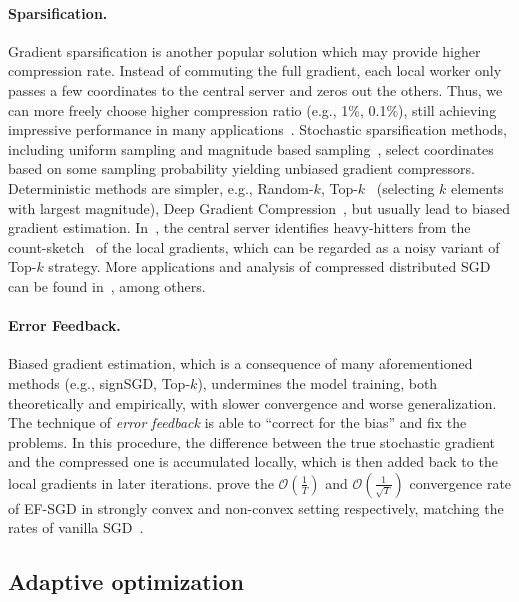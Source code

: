 \documentclass[11pt]{article}
\begin{document}
\paragraph{Sparsification.} Gradient sparsification is another popular solution which may provide higher compression rate. Instead of commuting the full gradient, each local worker only passes a few coordinates to the central server and zeros out the others. Thus, we can more freely choose higher compression ratio (e.g., 1\%, 0.1\%), still achieving impressive performance in many applications~\cite{Proc:Lin_ICLR18}. Stochastic sparsification methods, including uniform sampling and magnitude based sampling~\cite{wangni2018gradient}, select coordinates based on some sampling probability yielding unbiased gradient compressors. Deterministic methods are simpler, e.g., Random-$k$, Top-$k$~\cite{stich2018sparsified,shi2019convergence} (selecting $k$ elements with largest magnitude), Deep Gradient Compression~\cite{Proc:Lin_ICLR18}, but usually lead to biased gradient estimation. In~\cite{Proc:Ivkin_NIPS19}, the central server identifies heavy-hitters from the count-sketch~\cite{Proc:Charikar_ICALP02} of the local gradients, which can be regarded as a noisy variant of Top-$k$ strategy. More applications and analysis of compressed distributed SGD can be found in~\cite{jiang2018linear,Proc:Shen_ICML18,alistarh2018convergence,Proc:Basu_NIPS19,Proc:Jiang_SIGMOD18}, among others.

\paragraph{Error Feedback.} Biased gradient estimation, which is a consequence of many aforementioned methods (e.g., signSGD, Top-$k$), undermines the model training, both theoretically and empirically, with slower convergence and worse generalization. The technique of \textit{error feedback} is able to ``correct for the bias'' and fix the problems. In this procedure, the difference between the true stochastic gradient and the compressed one is accumulated locally, which is then added back to the local gradients in later iterations. \cite{stich2018sparsified,karimireddy2019error} prove the $\mathcal O(\frac{1}{T})$ and $\mathcal O(\frac{1}{\sqrt T})$ convergence rate of EF-SGD in strongly convex and non-convex setting respectively, matching the rates of vanilla SGD~\cite{nemirovski2009robust,ghadimi2013stochastic}.


\subsection{Adaptive optimization}
\end{document}
